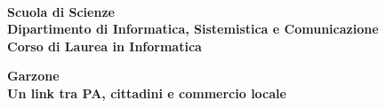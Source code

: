 \begin{titlepage}
	\noindent
	\begin{minipage}[t]{0.18\textwidth}
	\end{minipage}
	\begin{minipage}[t]{0.82\textwidth}
		{
			 \\
			\textbf{Scuola di Scienze} \\
			\textbf{Dipartimento di Informatica, Sistemistica e Comunicazione} \\
			\textbf{Corso di Laurea in Informatica} \\
			\par
		}
	\end{minipage}
	
	\vspace{40mm}
	
	\begin{center}
		{\LARGE{
				\textbf{Garzone \\ Un link tra PA, cittadini e commercio locale}
				\par
		}}
	\end{center}
	

\end{titlepage}
